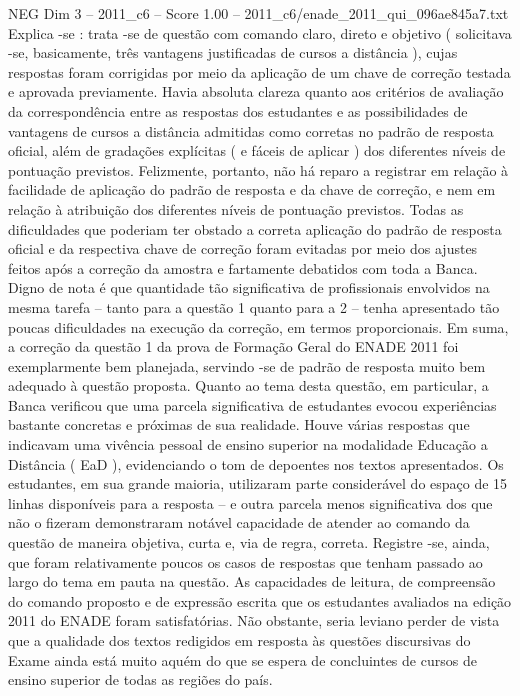 \begin{textsample}{NEG Dim 3 – 2011\_c6 – Score 1.00 – 2011\_c6/enade\_2011\_qui\_096ae845a7.txt}
Explica -se : trata -se de questão com comando claro, direto e objetivo ( solicitava -se, basicamente, três vantagens justificadas de cursos a distância ), cujas respostas foram corrigidas por meio da aplicação de um chave de correção testada e aprovada previamente.
Havia absoluta clareza quanto aos critérios de avaliação da correspondência entre as respostas dos estudantes e as possibilidades de vantagens de cursos a distância admitidas como corretas no padrão de resposta oficial, além de gradações explícitas ( e fáceis de aplicar ) dos diferentes níveis de pontuação previstos.
Felizmente, portanto, não há reparo a registrar em relação à facilidade de aplicação do padrão de resposta e da chave de correção, e nem em relação à atribuição dos diferentes níveis de pontuação previstos.
Todas as dificuldades que poderiam ter obstado a correta aplicação do padrão de resposta oficial e da respectiva chave de correção foram evitadas por meio dos ajustes feitos após a correção da amostra e fartamente debatidos com toda a Banca.
Digno de nota é que quantidade tão significativa de profissionais envolvidos na mesma tarefa – tanto para a questão 1 quanto para a 2 – tenha apresentado tão poucas dificuldades na execução da correção, em termos proporcionais.
Em suma, a correção da questão 1 da prova de Formação Geral do ENADE 2011 foi exemplarmente bem planejada, servindo -se de padrão de resposta muito bem adequado à questão proposta.
Quanto ao tema desta questão, em particular, a Banca verificou que uma parcela significativa de estudantes evocou experiências bastante concretas e próximas de sua realidade.
Houve várias respostas que indicavam uma vivência pessoal de ensino superior na modalidade Educação a Distância ( EaD ), evidenciando o tom de depoentes nos textos apresentados.
Os estudantes, em sua grande maioria, utilizaram parte considerável do espaço de 15 linhas disponíveis para a resposta – e outra parcela menos significativa dos que não o fizeram demonstraram notável capacidade de atender ao comando da questão de maneira objetiva, curta e, via de regra, correta.
Registre -se, ainda, que foram relativamente poucos os casos de respostas que tenham passado ao largo do tema em pauta na questão.
As capacidades de leitura, de compreensão do comando proposto e de expressão escrita que os estudantes avaliados na edição 2011 do ENADE foram satisfatórias.
Não obstante, seria leviano perder de vista que a qualidade dos textos redigidos em resposta às questões discursivas do Exame ainda está muito aquém do que se espera de concluintes de cursos de ensino superior de todas as regiões do país.

\end{textsample}
